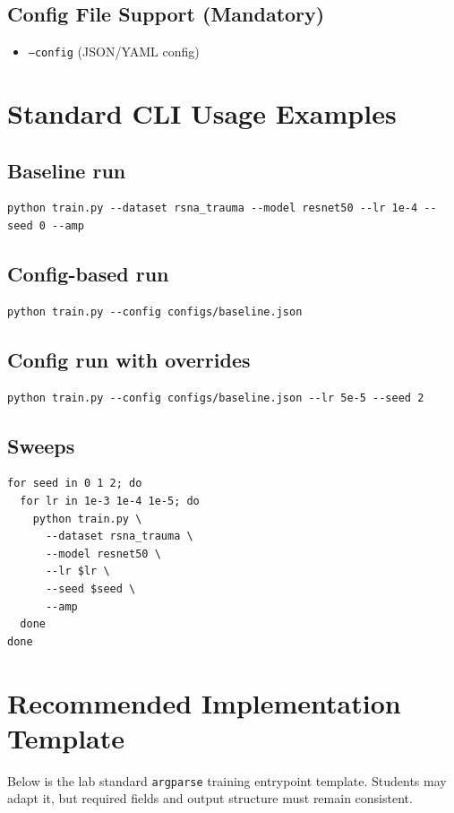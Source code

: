 \documentclass[11pt]{article}
\begin{document}
\subsection{Config File Support (Mandatory)}
\begin{itemize}
    \item \texttt{--config} (JSON/YAML config)
\end{itemize}

\section{Standard CLI Usage Examples}

\subsection{Baseline run}
\begin{lstlisting}
python train.py --dataset rsna_trauma --model resnet50 --lr 1e-4 --seed 0 --amp
\end{lstlisting}

\subsection{Config-based run}
\begin{lstlisting}
python train.py --config configs/baseline.json
\end{lstlisting}

\subsection{Config run with overrides}
\begin{lstlisting}
python train.py --config configs/baseline.json --lr 5e-5 --seed 2
\end{lstlisting}

\subsection{Sweeps}
\begin{lstlisting}
for seed in 0 1 2; do
  for lr in 1e-3 1e-4 1e-5; do
    python train.py \
      --dataset rsna_trauma \
      --model resnet50 \
      --lr $lr \
      --seed $seed \
      --amp
  done
done
\end{lstlisting}

\section{Recommended Implementation Template}
Below is the lab standard \texttt{argparse} training entrypoint template. Students may adapt it, but required fields and output structure must remain consistent.
\end{document}
